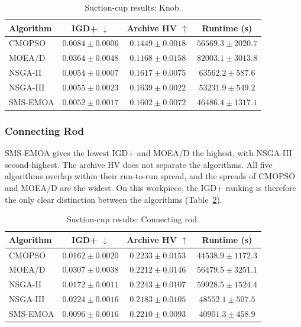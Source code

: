 \begin{table}[htbp]
    \centering
    \caption{Suction-cup results: Knob.}
    \label{tab:sc_evo_knob}
    \begin{tabular}{@{}lccc@{}}
        \toprule
        \textbf{Algorithm} & \textbf{IGD+} $\downarrow$ & \textbf{Archive HV} $\uparrow$ & \textbf{Runtime (s)} \\
        \midrule
        CMOPSO   & $0.0084 \pm 0.0006$ & $0.1449 \pm 0.0018$ & $56569.3 \pm 2020.7$ \\
        MOEA/D   & $0.0364 \pm 0.0048$ & $0.1168 \pm 0.0158$ & $82003.1 \pm 3013.8$ \\
        NSGA-II  & $0.0054 \pm 0.0007$ & $0.1617 \pm 0.0075$ & $63562.2 \pm 587.6$ \\
        NSGA-III & $0.0055 \pm 0.0023$ & {\boldmath$0.1639 \pm 0.0022$} & $53231.9 \pm 549.2$ \\
        SMS-EMOA & {\boldmath$0.0052 \pm 0.0017$} & $0.1602 \pm 0.0072$ & $46486.4 \pm 1317.1$ \\
        \bottomrule
    \end{tabular}
\end{table}

\subsubsection{Connecting Rod}
\label{subsubsec:results_sc_connecting_rod}

SMS-EMOA gives the lowest IGD+ and MOEA/D the highest, with NSGA-III second-highest. The
archive HV does not separate the algorithms. All five algorithms overlap within their
run-to-run spread, and the spreads of CMOPSO and MOEA/D are the widest. On this workpiece,
the IGD+ ranking is therefore the only clear distinction between the algorithms
(Table~\ref{tab:sc_evo_connecting_rod}).

\begin{table}[htbp]
    \centering
    \caption{Suction-cup results: Connecting rod.}
    \label{tab:sc_evo_connecting_rod}
    \begin{tabular}{@{}lccc@{}}
        \toprule
        \textbf{Algorithm} & \textbf{IGD+} $\downarrow$ & \textbf{Archive HV} $\uparrow$ & \textbf{Runtime (s)} \\
        \midrule
        CMOPSO   & $0.0162 \pm 0.0020$ & $0.2233 \pm 0.0153$ & $44538.9 \pm 1172.3$ \\
        MOEA/D   & $0.0307 \pm 0.0038$ & $0.2212 \pm 0.0146$ & $56479.5 \pm 3251.1$ \\
        NSGA-II  & $0.0172 \pm 0.0011$ & {\boldmath$0.2243 \pm 0.0107$} & $59928.5 \pm 1524.4$ \\
        NSGA-III & $0.0224 \pm 0.0016$ & $0.2183 \pm 0.0105$ & $48552.1 \pm 507.5$ \\
        SMS-EMOA & {\boldmath$0.0096 \pm 0.0016$} & $0.2210 \pm 0.0093$ & $40901.3 \pm 458.9$ \\
        \bottomrule
    \end{tabular}
\end{table}

